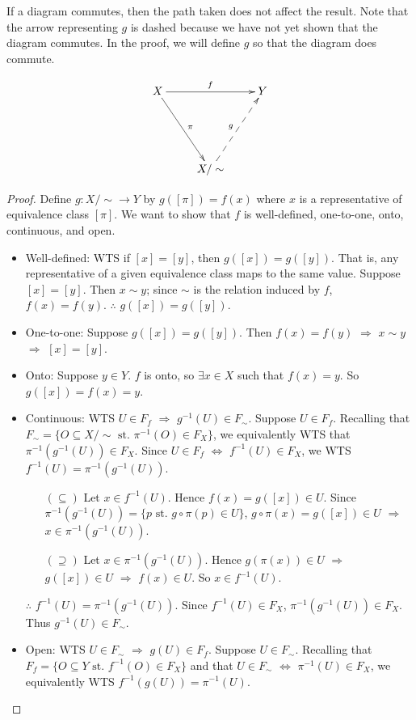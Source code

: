 If a diagram commutes, then the path taken does not affect the result. Note that the arrow representing $g$ is dashed because we have not yet shown that the diagram commutes. In the proof, we will define $g$ so that the diagram does commute.

\[ \xymatrix{ X \ar[rr]^f \ar[ddr]^\pi & & Y \\
\\
& X/\sim \ar@{-->}[uur]^g } \]
\begin{proof}
	Define $g \colon X/\sim \rightarrow Y$ by $g([\pi]) = f(x)$ where $x$ is a representative of equivalence class $[\pi]$. We want to show that $f$ is well-defined, one-to-one, onto, continuous, and open. 
	\begin{itemize}
		\item Well-defined: WTS if $[x]=[y]$, then $g([x])=g([y])$. That is, any representative of a given equivalence class maps to the same value. Suppose $[x]=[y]$. Then $x \sim y$; since $\sim$ is the relation induced by $f$, $f(x)=f(y)$. $\therefore$ $g([x])=g([y])$. 
		\item One-to-one: Suppose $g([x])=g([y])$. Then $f(x)=f(y)$ $\Rightarrow$ $x \sim y$ $\Rightarrow$ $[x]=[y]$. 
		\item Onto: Suppose $y \in Y$. $f$ is onto, so $\exists x \in X$ such that $f(x)=y$. So $g([x]) = f(x) = y$. 
		\item Continuous: WTS $U \in F_f$ $\Rightarrow$ $g^{-1}(U) \in F_\sim$. Suppose $U \in F_f$. Recalling that $F_\sim = \{ O \subseteq X/\sim \text{ st. } \pi^{-1}(O) \in F_X \}$, we equivalently WTS that $\pi^{-1}(g^{-1}(U)) \in F_X$. Since $U \in F_f$ $\Leftrightarrow$ $f^{-1}(U) \in F_X$, we WTS $f^{-1}(U) = \pi^{-1}(g^{-1}(U))$. 
		\begin{itemize}
			\item[$(\subseteq)$] Let $x \in f^{-1}(U)$. Hence $f(x) = g([x]) \in U$. Since $\pi^{-1}(g^{-1}(U)) = \{ p \text{ st. } g \circ \pi (p) \in U \}$, $g \circ \pi (x) = g([x]) \in U$ $\Rightarrow$ $x \in \pi^{-1}(g^{-1}(U))$. 
			\item[$(\supseteq)$] Let $x \in \pi^{-1}(g^{-1}(U))$. Hence $g(\pi(x)) \in U$ $\Rightarrow$ $g([x]) \in U$ $\Rightarrow$ $f(x) \in U$. So $x \in f^{-1}(U)$. 
		\end{itemize}
		$\therefore$ $f^{-1}(U) = \pi^{-1}(g^{-1}(U))$. Since $f^{-1}(U) \in F_X$, $\pi^{-1}(g^{-1}(U)) \in F_X$. Thus $g^{-1}(U) \in F_\sim$. 
		\item Open: WTS $U \in F_\sim$ $\Rightarrow$ $g(U) \in F_f$. Suppose $U \in F_\sim$. Recalling that $F_f = \{ O \subseteq Y \text{ st. } f^{-1}(O) \in F_X \}$ and that $U \in F_\sim$ $\Leftrightarrow$ $\pi^{-1}(U) \in F_X$, we equivalently WTS $f^{-1}(g(U)) = \pi^{-1}(U)$. 

\end{itemize}
\end{proof}

